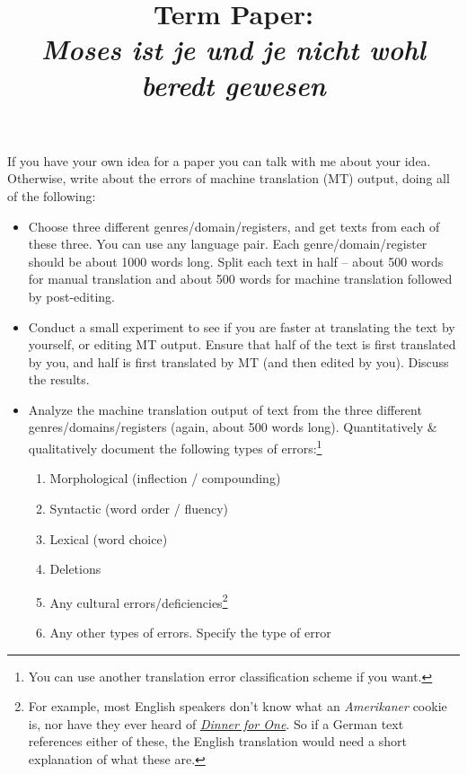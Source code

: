 \documentclass[10pt]{article}
\title{Term Paper: \\[1.0em] \Large{\textit{Moses ist je und je nicht wohl beredt gewesen}}}
\begin{document}
\maketitle


\begin{spacing}{1.30}

If you have your own idea for a paper you can talk with me about your idea.
Otherwise, write about the errors of machine translation (MT) output, doing all of the following:

\begin{itemize}
\item Choose three different genres/domain/registers, and get texts from each of these three.
	You can use any language pair.
	Each genre/domain/register should be about 1000 words long.
	Split each text in half -- about 500 words for manual translation and about 500 words for machine translation followed by post-editing.

\item Conduct a small experiment to see if you are faster at translating the text by yourself, or editing MT output.
	Ensure that half of the text is first translated by you, and half is first translated by MT (and then edited by you).
	Discuss the results.

\item Analyze the machine translation output of text from the three different genres/domains/registers (again, about 500 words long).
	Quantitatively \& qualitatively document the following types of errors:\footnote{You can use another translation error classification scheme if you want.}
 \begin{spacing}{0.9}
 \begin{enumerate}
  \item Morphological (inflection / compounding)
  \item Syntactic (word order / fluency)
  \item Lexical (word choice)
  \item Deletions
  \item Any cultural errors/deficiencies\footnote{For example, most English speakers don't know what an \textit{Amerikaner} cookie is, nor have they ever heard of \href{https://en.wikipedia.org/wiki/Dinner_for_One}{\textit{Dinner for One}}.  So if a German text references either of these, the English translation would need a short explanation of what these are.}
  \item Any other types of errors.  Specify the type of error
 \end{enumerate}
 \end{spacing}


\end{itemize}
\end{spacing}
\end{document}
